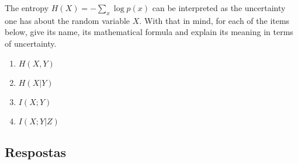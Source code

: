 The entropy $H(X) = -\sum_{x}{\log p(x)}$ can be interpreted as the uncertainty one has about the random variable $X$. With that in mind, for each of the items below, give its name, its mathematical formula and explain its meaning in terms of uncertainty.

\begin{enumerate}
    \item $H(X, Y)$
    \item $H(X | Y)$
    \item $I(X; Y)$
    \item $I(X; Y | Z)$
\end{enumerate}

\subsection*{Respostas}

